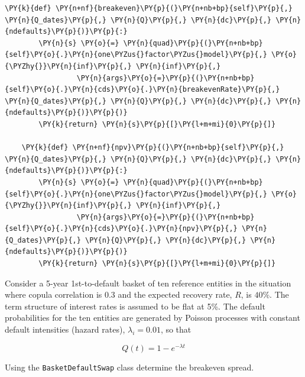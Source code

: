 \begin{codebox}
\begin{Verbatim}[commandchars=\\\{\}]
    \PY{k}{def} \PY{n+nf}{breakeven}\PY{p}{(}\PY{n+nb+bp}{self}\PY{p}{,} \PY{n}{Q_dates}\PY{p}{,} \PY{n}{Q}\PY{p}{,} \PY{n}{dc}\PY{p}{,} \PY{n}{ndefaults}\PY{p}{)}\PY{p}{:}
        \PY{n}{s} \PY{o}{=} \PY{n}{quad}\PY{p}{(}\PY{n+nb+bp}{self}\PY{o}{.}\PY{n}{one\PYZus{}factor\PYZus{}model}\PY{p}{,} \PY{o}{\PYZhy{}}\PY{n}{inf}\PY{p}{,} \PY{n}{inf}\PY{p}{,} 
                 \PY{n}{args}\PY{o}{=}\PY{p}{(}\PY{n+nb+bp}{self}\PY{o}{.}\PY{n}{cds}\PY{o}{.}\PY{n}{breakevenRate}\PY{p}{,} \PY{n}{Q_dates}\PY{p}{,} \PY{n}{Q}\PY{p}{,} \PY{n}{dc}\PY{p}{,} \PY{n}{ndefaults}\PY{p}{)}\PY{p}{)}
        \PY{k}{return} \PY{n}{s}\PY{p}{[}\PY{l+m+mi}{0}\PY{p}{]}
		
    \PY{k}{def} \PY{n+nf}{npv}\PY{p}{(}\PY{n+nb+bp}{self}\PY{p}{,} \PY{n}{Q_dates}\PY{p}{,} \PY{n}{Q}\PY{p}{,} \PY{n}{dc}\PY{p}{,} \PY{n}{ndefaults}\PY{p}{)}\PY{p}{:}
        \PY{n}{s} \PY{o}{=} \PY{n}{quad}\PY{p}{(}\PY{n+nb+bp}{self}\PY{o}{.}\PY{n}{one\PYZus{}factor\PYZus{}model}\PY{p}{,} \PY{o}{\PYZhy{}}\PY{n}{inf}\PY{p}{,} \PY{n}{inf}\PY{p}{,} 
                 \PY{n}{args}\PY{o}{=}\PY{p}{(}\PY{n+nb+bp}{self}\PY{o}{.}\PY{n}{cds}\PY{o}{.}\PY{n}{npv}\PY{p}{,} \PY{n}{Q_dates}\PY{p}{,} \PY{n}{Q}\PY{p}{,} \PY{n}{dc}\PY{p}{,} \PY{n}{ndefaults}\PY{p}{)}\PY{p}{)}
        \PY{k}{return} \PY{n}{s}\PY{p}{[}\PY{l+m+mi}{0}\PY{p}{]}        
\end{Verbatim}
\end{codebox}

Consider a 5-year 1st-to-default basket of ten
reference entities in the situation where copula correlation is 0.3
and the expected recovery rate, \(R\), is \(40\%\). The term structure
of interest rates is assumed to be flat at 5\%. The default
probabilities for the ten entities are generated by Poisson processes
with constant default intensities (hazard rates), \(\lambda_i=0.01\), so that

\[ Q(t) = 1 - e^{-\lambda t} \]

Using the \texttt{BasketDefaultSwap} class determine the breakeven spread.

